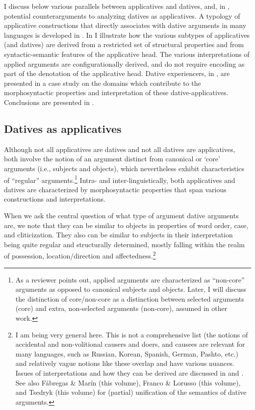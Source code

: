 \documentclass[output=paper,colorlinks,citecolor=brown,nonflat]{./langscibook}
\begin{document}
I discuss below various parallels between applicatives and datives, and, in , potential counterarguments to analyzing datives as applicatives. A typology of applicative constructions that directly associates with dative arguments in many languages is developed in . In  I illustrate how the various subtypes of applicatives (and datives) are derived from a restricted set of structural properties and from syntactic-semantic features of the applicative head. The various interpretations of applied arguments are configurationally derived, and do not require encoding as part of the denotation of the applicative head. Dative experiencers, in , are presented in a case study on the domains which contribute to the morphosyntactic properties and interpretation of these dative-applicatives. Conclusions are presented in .

\subsection{Datives as applicatives}\label{sec:cuervo:1.2}

Although not all applicatives are datives and not all datives are applicatives, both involve the notion of an argument distinct from canonical or ‘core’ arguments (i.e., subjects and objects), which nevertheless exhibit characteristics of “regular” arguments.\footnote{As a reviewer points out, applied arguments are characterized as ``non-core'' arguments as opposed to canonical subjects and objects. Later, I will discuss the distinction of core/non-core as a distinction between selected arguments (core) and extra, non-selected arguments (non-core), assumed in other work.}  Intra- and inter-linguistically, both applicatives and datives are characterized by morphosyntactic properties that span various constructions and interpretations. 

When we ask the central question of what type of argument dative arguments are, we note that they can be similar to objects in properties of word order, case, and cliticization. They also can be similar to subjects in their interpretation being quite regular and structurally determined, mostly falling within the realm of possession, location/direction and affectedness.\footnote{I am being very general here. This is not a comprehensive list (the notions of accidental and non-volitional causers and doers, and causees are relevant for many languages, such as Russian, Korean, Spanish, German, Pashto, etc.) and relatively vague notions like these overlap and have various nuances. Issues of interpretations and how they can be derived are discussed in  and . See also Fábregas \& Marín (this volume), Franco \& Lorusso (this volume), and Tsedryk (this volume) for (partial) unification of the semantics of dative arguments.}   
\end{document}
